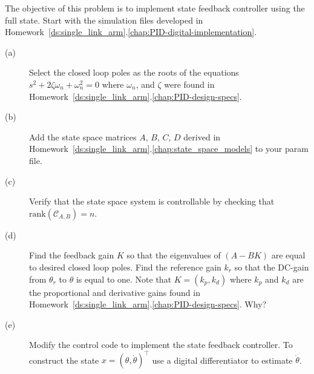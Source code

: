 
The objective of this problem is to implement state feedback controller using the full state.
Start with the simulation files developed in Homework~\ref{ds:single_link_arm}.\ref{chap:PID-digital-implementation}.
\begin{description}
\item[(a)] Select the closed loop poles as the roots of the equations $s^2 + 2\zeta\omega_n + \omega_n^2 = 0$ where $\omega_n$, and $\zeta$ were found in Homework~\ref{ds:single_link_arm}.\ref{chap:PID-design-specs}.  
\item[(b)] Add the state space matrices $A$, $B$, $C$, $D$ derived in Homework~\ref{ds:single_link_arm}.\ref{chap:state_space_models} to your param file.
\item[(c)] Verify that the state space system is controllable by checking that $\text{rank}(\mathcal{C}_{A,B})=n$.
\item[(d)] Find the feedback gain $K$ so that the eigenvalues of $(A-BK)$ are equal to desired closed loop poles.  Find the reference gain $k_r$ so that the DC-gain from $\theta_r$ to $\theta$ is equal to one.  Note that $K=(k_p, k_d)$ where $k_p$ and $k_d$ are the proportional and derivative gains found in Homework~\ref{ds:single_link_arm}.\ref{chap:PID-design-specs}.  Why?
\item[(e)] Modify the control code to implement the state feedback controller.  To construct the state $x=(\theta, \dot{\theta})^{\top}$ use a digital differentiator to estimate $\dot{\theta}$.
\end{description}
